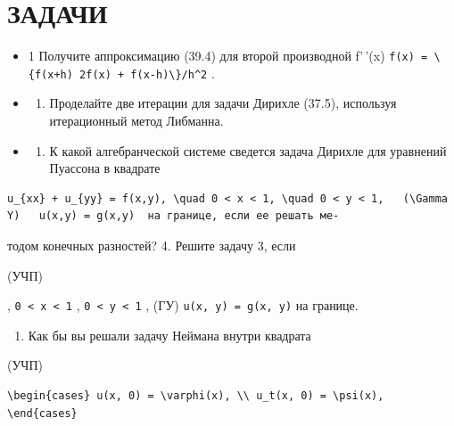 \documentclass[
  ukrainian,
]{article}
\providecommand{\tightlist}{%
  \setlength{\itemsep}{0pt}\setlength{\parskip}{0pt}}
\begin{document}
\section{ЗАДАЧИ}\label{ux437ux430ux434ux430ux447ux438-6}

\begin{itemize}
\tightlist
\item
  1 Получите аппроксимацию (39.4) для второй производной f'\,'(x)
  \texttt{f\textquotesingle{}\textquotesingle{}(x)\ =\ \textbackslash{}\{f(x+h)\ 2f(x)\ +\ f(x-h)\textbackslash{}\}/h\^{}2}
  .
\item
  \begin{enumerate}
  \def\labelenumi{\arabic{enumi}.}
  \setcounter{enumi}{1}
  \tightlist
  \item
    Проделайте две итерации для задачи Дирихле (37.5), используя
    итерационный метод Либманна.
  \end{enumerate}
\item
  \begin{enumerate}
  \def\labelenumi{\arabic{enumi}.}
  \setcounter{enumi}{2}
  \tightlist
  \item
    К какой алгебранческой системе сведется задача Дирихле для уравнений
    Пуассона в квадрате
  \end{enumerate}
\end{itemize}

\begin{verbatim}
u_{xx} + u_{yy} = f(x,y), \quad 0 < x < 1, \quad 0 < y < 1,   (\Gamma Y)   u(x,y) = g(x,y)  на границе, если ее решать ме-
\end{verbatim}

тодом конечных разностей? 4. Решите задачу 3, если

(УЧП)

, \texttt{0\ \textless{}\ x\ \textless{}\ 1} ,
\texttt{0\ \textless{}\ y\ \textless{}\ 1} , (ГУ)
\texttt{u(x,\ y)\ =\ g(x,\ y)} на границе.

\begin{enumerate}
\def\labelenumi{\arabic{enumi}.}
\setcounter{enumi}{4}
\tightlist
\item
  Как бы вы решали задачу Неймана внутри квадрата
\end{enumerate}

(УЧП)

\begin{verbatim}
\begin{cases} u(x, 0) = \varphi(x), \\ u_t(x, 0) = \psi(x), \end{cases}
\end{verbatim}
\end{document}
